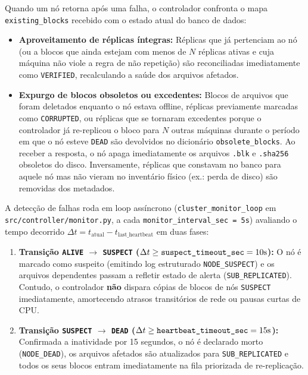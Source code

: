 \documentclass[10pt,a4paper]{article}
\begin{document}
Quando um nó retorna após uma falha, o controlador confronta o mapa \texttt{existing\_blocks} recebido com o estado atual do banco de dados:
\begin{itemize}
    \item \textbf{Aproveitamento de réplicas íntegras:} Réplicas que já pertenciam ao nó (ou a blocos que ainda estejam com menos de $N$ réplicas ativas e cuja máquina não viole a regra de não repetição) são reconciliadas imediatamente como \texttt{VERIFIED}, recalculando a saúde dos arquivos afetados.
    \item \textbf{Expurgo de blocos obsoletos ou excedentes:} Blocos de arquivos que foram deletados enquanto o nó estava offline, réplicas previamente marcadas como \texttt{CORRUPTED}, ou réplicas que se tornaram excedentes porque o controlador já re-replicou o bloco para $N$ outras máquinas durante o período em que o nó esteve \texttt{DEAD} são devolvidos no dicionário \texttt{obsolete\_blocks}. Ao receber a resposta, o nó apaga imediatamente os arquivos \texttt{.blk} e \texttt{.sha256} obsoletos do disco. Inversamente, réplicas que constavam no banco para aquele nó mas não vieram no inventário físico (ex.: perda de disco) são removidas dos metadados.
\end{itemize}

A detecção de falhas roda em loop assíncrono (\texttt{cluster\_monitor\_loop} em \texttt{src/controller/monitor.py}, a cada \texttt{monitor\_interval\_sec = 5s}) avaliando o tempo decorrido $\Delta t = t_{\text{atual}} - t_{\text{last\_heartbeat}}$ em duas fases:
\begin{enumerate}
    \item \textbf{Transição \texttt{ALIVE} $\rightarrow$ \texttt{SUSPECT} ($\Delta t \ge \text{\texttt{suspect\_timeout\_sec}} = 10\text{s}$):} O nó é marcado como suspeito (emitindo log estruturado \texttt{NODE\_SUSPECT}) e os arquivos dependentes passam a refletir estado de alerta (\texttt{SUB\_REPLICATED}). Contudo, o controlador \textbf{não} dispara cópias de blocos de nós \texttt{SUSPECT} imediatamente, amortecendo atrasos transitórios de rede ou pausas curtas de CPU.
    \item \textbf{Transição \texttt{SUSPECT} $\rightarrow$ \texttt{DEAD} ($\Delta t \ge \text{\texttt{heartbeat\_timeout\_sec}} = 15\text{s}$):} Confirmada a inatividade por 15 segundos, o nó é declarado morto (\texttt{NODE\_DEAD}), os arquivos afetados são atualizados para \texttt{SUB\_REPLICATED} e todos os seus blocos entram imediatamente na fila priorizada de re-replicação.
\end{enumerate}
\end{document}
